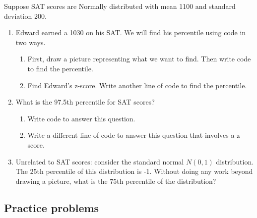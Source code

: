\documentclass[
  letterpaper,
  DIV=11,
  numbers=noendperiod]{scrartcl}
\providecommand{\tightlist}{%
  \setlength{\itemsep}{0pt}\setlength{\parskip}{0pt}}\usepackage{longtable,booktabs,array}
\begin{document}
Suppose SAT scores are Normally distributed with mean 1100 and standard
deviation 200.

\begin{enumerate}
\def\labelenumi{\arabic{enumi}.}
\tightlist
\item
  Edward earned a 1030 on his SAT. We will find his percentile using
  code in two ways.

  \begin{enumerate}
  \def\labelenumii{\alph{enumii}.}
  \tightlist
  \item
    First, draw a picture representing what we want to find. Then write
    code to find the percentile.
  \item
    Find Edward's z-score. Write another line of code to find the
    percentile.
  \end{enumerate}
\item
  What is the 97.5th percentile for SAT scores?

  \begin{enumerate}
  \def\labelenumii{\alph{enumii}.}
  \tightlist
  \item
    Write code to answer this question.
  \item
    Write a different line of code to answer this question that involves
    a z-score.
  \end{enumerate}
\item
  Unrelated to SAT scores: consider the standard normal \(N(0,1)\)
  distribution. The 25th percentile of this distribution is -1. Without
  doing any work beyond drawing a picture, what is the 75th percentile
  of the distribution?
\end{enumerate}

\clearpage

\hypertarget{practice-problems}{%
\subsection{Practice problems}\label{practice-problems}}
\end{document}
